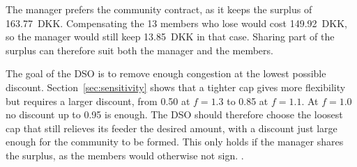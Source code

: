 The manager prefers the community contract, as it keeps the surplus of 163.77~DKK. Compensating the 13 members who lose would cost 149.92~DKK, so the manager would still keep 13.85~DKK in that case. Sharing part of the surplus can therefore suit both the manager and the members.

The goal of the DSO is to remove enough congestion at the lowest possible discount. Section~\ref{sec:sensitivity} shows that a tighter cap gives more flexibility but requires a larger discount, from 0.50 at $f=1.3$ to 0.85 at $f=1.1$. At $f=1.0$ no discount up to 0.95 is enough. The DSO should therefore choose the loosest cap that still relieves its feeder the desired amount, with a discount just large enough for the community to be formed. This only holds if the manager shares the surplus, as the members would otherwise not sign.
.



